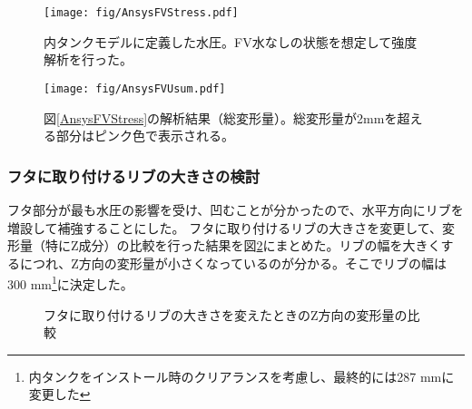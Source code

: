\documentclass[11pt]{jreport}
\newcommand{\figref}[1]{図\ref{#1}}
\begin{document}
\begin{figure}[htbp]
\begin{minipage}{0.47\textwidth}
\centering
\texttt{[image: fig/AnsysFVStress.pdf]}
\caption[内タンクモデルに定義した水圧]{内タンクモデルに定義した水圧。FV水なしの状態を想定して強度解析を行った。}
\label{AnsysFVStress}
\end{minipage}
\hfill
\begin{minipage}{0.47\textwidth}
\centering
\texttt{[image: fig/AnsysFVUsum.pdf]}
\caption[\figref{AnsysFVStress}の解析結果（総変形量）]{\figref{AnsysFVStress}の解析結果（総変形量）。総変形量が2mmを超える部分はピンク色で表示される。}
\label{AnsysFVUsum}
\end{minipage}
\end{figure}

\subsubsection{フタに取り付けるリブの大きさの検討}
フタ部分が最も水圧の影響を受け、凹むことが分かったので、水平方向にリブを増設して補強することにした。
フタに取り付けるリブの大きさを変更して、変形量（特にZ成分）の比較を行った結果を\figref{AnsysFVf}にまとめた。リブの幅を大きくするにつれ、Z方向の変形量が小さくなっているのが分かる。そこでリブの幅は300 mm\footnote{内タンクをインストール時のクリアランスを考慮し、最終的には287 mmに変更した}に決定した。

\begin{figure}[htbp]
  \begin{minipage}{0.47\textwidth}
  \end{minipage}
  \hfill
  \begin{minipage}{0.47\textwidth}
  \end{minipage}
  \hfill
  \begin{minipage}{0.47\textwidth}
  \end{minipage}
  \hfill \begin{minipage}{0.47\textwidth}
  \end{minipage}
  \hfill
  \begin{minipage}{0.47\textwidth}
  \end{minipage}
  \hfill
    \caption{フタに取り付けるリブの大きさを変えたときのZ方向の変形量の比較}
  \label{AnsysFVf}
\end{figure}
\end{document}
